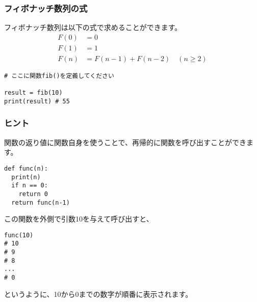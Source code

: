 \documentclass[a4paper,titlepage,dvipdfmx]{jarticle}
\begin{document}
\subsubsection*{フィボナッチ数列の式}
フィボナッチ数列は以下の式で求めることができます。
\begin{align}
  F(0) & = 0                                \\
  F(1) & = 1                                \\
  F(n) & = F(n-1) + F(n-2) \quad (n \geq 2)
\end{align}
\begin{lstlisting}[caption=応用課題,label=応用課題]
# ここに関数fib()を定義してください

result = fib(10)
print(result) # 55
\end{lstlisting}
\subsubsection*{ヒント}
関数の返り値に関数自身を使うことで、再帰的に関数を呼び出すことができます。
\begin{lstlisting}[caption=再帰関数,label=再帰関数]
def func(n):
  print(n)
  if n == 0:
    return 0
  return func(n-1)
\end{lstlisting}
この関数を外側で引数10を与えて呼び出すと、
\begin{lstlisting}[caption=再帰関数の呼び出し,label=再帰関数の呼び出し]
func(10)
# 10
# 9
# 8
...
# 0
\end{lstlisting}
というように、10から0までの数字が順番に表示されます。
\end{document}

